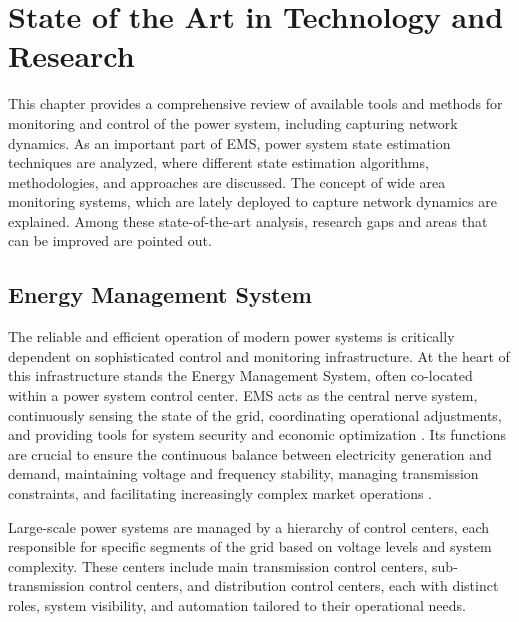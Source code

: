 \chapter{State of the Art in Technology and Research}\label{ch:ch1}

This chapter provides a comprehensive review of available tools and methods for monitoring and control of the power system, including capturing network dynamics. As an important part of EMS, power system state estimation techniques are analyzed, where different state estimation algorithms, methodologies,  and approaches are discussed. The concept of wide area monitoring systems, which are lately deployed to capture network dynamics are explained. Among these state-of-the-art analysis, research gaps and areas that can be improved are pointed out.

\section{Energy Management System}\label{sec:ch1/sec1}

The reliable and efficient operation of modern power systems is critically dependent on sophisticated control and monitoring infrastructure. At the heart of this infrastructure stands the Energy Management System, often co-located within a power system control center. EMS acts as the central nerve system, continuously sensing the state of the grid, coordinating operational adjustments, and providing tools for system security and economic optimization \autocite{8278740}. Its functions are crucial to ensure the continuous balance between electricity generation and demand, maintaining voltage and frequency stability, managing transmission constraints, and facilitating increasingly complex market operations \autocite{Handschin_Petroianu_1991}.

Large-scale power systems are managed by a hierarchy of control centers, each responsible for specific segments of the grid based on voltage levels and system complexity. These centers include main transmission control centers, sub-transmission control centers, and distribution control centers, each with distinct roles, system visibility, and automation tailored to their operational needs. 

